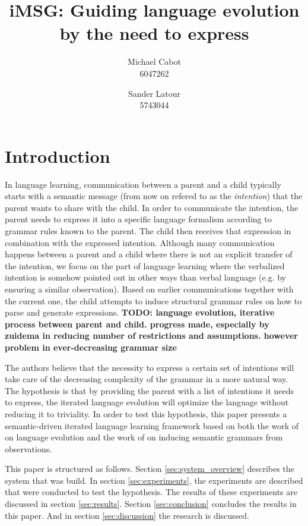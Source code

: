 \documentclass[a4paper]{article}
\title{iMSG: Guiding language evolution by the need to express}
\author{Michael Cabot\\6047262 \and Sander Latour\\5743044}
\begin{document}
\maketitle
\section{Introduction}
\cite{zuidema2003poverty} \cite{batali1999negotiation}
In language learning, communication between a parent and a child typically starts with a semantic message (from now on refered to as the \emph{intention}) that the parent wants to share with the child. In order to communicate the intention, the parent needs to express it into a specific language formalism according to grammar rules known to the parent. The child then receives that expression in combination with the expressed intention. Although many communication happens between a parent and a child where there is not an explicit transfer of the intention, we focus on the part of language learning where the verbalized intention is somehow pointed out in other ways than verbal language (e.g. by ensuring a similar observation). Based on earlier communications together with the current one, the child attempts to induce structural grammar rules on how to parse and generate expressions.
\textbf{TODO: language evolution, iterative process between parent and child. progress made, especially by zuidema in reducing number of restrictions and assumptions. however problem in ever-decreasing grammar size}

The authors believe that the necessity to express a certain set of intentions will take care of the decreasing complexity of the grammar in a more natural way. The hypothesis is that by providing the parent with a list of intentions it needs to express, the iterated language evolution will optimize the language without reducing it to triviality. In order to test this hypothesis, this paper presents a semantic-driven iterated language learning framework based on both the work of \cite{zuidema2003poverty} on language evolution and the work of \cite{batali1999negotiation} on inducing semantic grammars from observations.

This paper is structured as follows. Section \ref{sec:system_overview} describes the system that was build. In section \ref{sec:experiments}, the experiments are described that were conducted to test the hypothesis. The results of these experiments are discussed in section \ref{sec:results}. Section \ref{sec:conclusion} concludes the results in this paper. And in section \ref{sec:discussion} the research is discussed.
\end{document}
